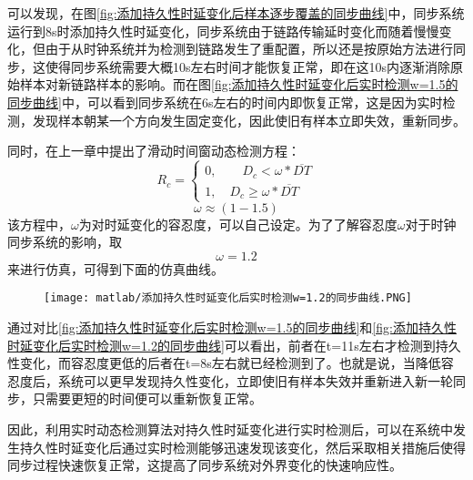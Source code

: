 可以发现，在图\ref{fig:添加持久性时延变化后样本逐步覆盖的同步曲线}中，同步系统运行到8s时添加持久性时延变化，同步系统由于链路传输延时变化而随着慢慢变化，但由于从时钟系统并为检测到链路发生了重配置，所以还是按原始方法进行同步，这使得同步系统需要大概10s左右时间才能恢复正常，即在这10s内逐渐消除原始样本对新链路样本的影响。而在图\ref{fig:添加持久性时延变化后实时检测w=1.5的同步曲线}中，可以看到同步系统在6s左右的时间内即恢复正常，这是因为实时检测，发现样本朝某一个方向发生固定变化，因此使旧有样本立即失效，重新同步。

同时，在上一章中提出了滑动时间窗动态检测方程：
\begin{equation}
R_{c} = \left\{
  \begin{array}{ll} %
    0, \qquad D_{c} < \omega * \overline{DT} \\
    1, \quad D_{c} \geq \omega * \overline{DT} 
  \end{array}
  \right. 
\end{equation}
\begin{equation}
  \omega \approx (1 - 1.5)
\end{equation}
该方程中，$\omega$为对时延变化的容忍度，可以自己设定。为了了解容忍度$\omega$对于时钟同步系统的影响，取
\begin{equation}
  \omega = 1.2
\end{equation}
来进行仿真，可得到下面的仿真曲线。
\begin{figure}[htbp]
  \centering
  \begin{minipage}[b]{1\textwidth}
    \captionstyle{\centering}
    \centering
    \texttt{[image: matlab/添加持久性时延变化后实时检测w=1.2的同步曲线.PNG]}
  \end{minipage}     
\end{figure}

通过对比\ref{fig:添加持久性时延变化后实时检测w=1.5的同步曲线}和\ref{fig:添加持久性时延变化后实时检测w=1.2的同步曲线}可以看出，前者在t=11s左右才检测到持久性变化，而容忍度更低的后者在t=8s左右就已经检测到了。也就是说，当降低容忍度后，系统可以更早发现持久性变化，立即使旧有样本失效并重新进入新一轮同步，只需要更短的时间便可以重新恢复正常。

因此，利用实时动态检测算法对持久性时延变化进行实时检测后，可以在系统中发生持久性时延变化后通过实时检测能够迅速发现该变化，然后采取相关措施后使得同步过程快速恢复正常，这提高了同步系统对外界变化的快速响应性。

